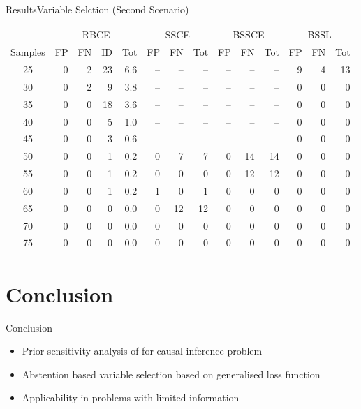 \documentclass[aspectratio=169]{beamer}					%
\begin{document}
\begin{frame}{Results}{Variable Selction (Second Scenario)}

\begin{table}[h]
    \begin{tabular}{|c||rrr|r||rr|r||rr|r||rr|r|}
  \hline
  &\multicolumn{4}{c||}{RBCE}&\multicolumn{3}{c||}{SSCE}
  &\multicolumn{3}{c||}{BSSCE}&\multicolumn{3}{c|}{BSSL}\\
  \cline{2-14}
 Samples & FP & FN & ID & Tot & FP & FN & Tot & FP & FN & Tot & FP & FN & Tot \\ 
  \hline
25 &   0 &   2 &  23 & 6.6 & -- & -- & -- & -- & -- & -- &   9 &   4 & 13\\ 
  30 &   0 &   2 &   9 & 3.8 & -- & -- & -- & -- & -- & -- &   0 &   0 & 0 \\ 
  35 &   0 &   0 &  18 & 3.6 & -- & -- & -- & -- & -- & -- &   0 &   0 & 0 \\ 
  40 &   0 &   0 &   5 & 1.0 &-- & -- & -- & -- & -- & -- &   0 &   0 & 0 \\ 
  45 &   0 &   0 &   3 & 0.6 & -- & -- & -- & -- & -- & -- &   0 &   0 & 0 \\ 
  50 &   0 &   0 &   1 & 0.2 &  0 &   7 & 7 &   0 &  14 & 14 &   0 &   0 & 0 \\ 
  55 &   0 &   0 &   1 & 0.2 &  0 &   0 & 0 &  0 &  12 & 12 &  0 &   0 & 0 \\ 
  60 &   0 &   0 &   1 & 0.2 &  1 &   0 & 1 &  0 &   0 &  0 & 0 &  0 &   0 \\ 
  65 &   0 &   0 &   0 & 0.0 &  0 &  12 & 12 &  0 &   0 &  0 & 0 &  0 &   0 \\ 
  70 &   0 &   0 &   0 & 0.0 &  0 &   0 &  0 &  0 &   0 &  0 & 0 &  0 &   0 \\ 
  75 &   0 &   0 &   0 & 0.0 &  0 &   0 &  0 &  0 &   0 &  0 & 0 &  0 &   0 \\ 
   \hline
\end{tabular}
\end{table}

\end{frame}



\fi

\section{Conclusion}

\iftrue
\begin{frame}{Conclusion}
    \begin{itemize}
        \item Prior sensitivity analysis of for causal inference problem
        \item Abstention based variable selection based on generalised loss function
        \item Applicability in problems with limited information 
    \end{itemize}
\end{frame}
\end{document}
